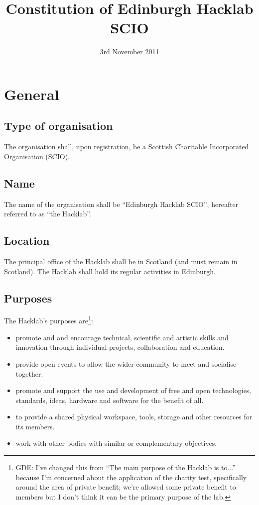 \documentclass{article}
\title{Constitution of Edinburgh Hacklab SCIO}
\date{3rd November 2011}
\begin{document}
\maketitle
\section{General}
\subsection{Type of organisation}
\clause The organisation shall, upon registration, be a Scottish
Charitable Incorporated Organisation (SCIO).
\subsection{Name}
\clause The name of the organisation shall be ``Edinburgh Hacklab
SCIO'', hereafter referred to as ``the Hacklab''.
\subsection{Location}
\clause The principal office of the Hacklab shall be in Scotland (and
must remain in Scotland).
\clause The Hacklab shall hold its regular activities in Edinburgh.
\subsection{Purposes}
\clause The Hacklab's purposes are\footnote{GDE: I've changed
  this from ``The main purpose of the Hacklab is to...'' because I'm
  concerned about the application of the charity test, specifically
  around the area of private benefit; we're allowed some private
  benefit to members but I don't think it can be the primary purpose
  of the lab.}:
\begin{itemize}
\item promote and and encourage technical, scientific and artistic
  skills and innovation through individual projects, collaboration and
  education.
\item provide open events to allow the wider community to meet and
  socialise together.
\item promote and support the use and development of free and open
  technologies, standards, ideas, hardware and software for the
  benefit of all.
\item to provide a shared physical workspace, tools, storage and other
  resources for its members.
\item work with other bodies with similar or complementary objectives.
\end{itemize}
\end{document}
